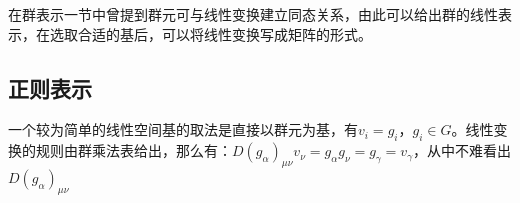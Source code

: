 \begin{issues}
\issueDraft
\end{issues}
在群表示一节中曾提到群元可与线性变换建立同态关系，由此可以给出群的线性表示，在选取合适的基后，可以将线性变换写成矩阵的形式。

\subsection{正则表示}

一个较为简单的线性空间基的取法是直接以群元为基，有$v_i=g_i$，$g_i \in G$。线性变换的规则由群乘法表给出，那么有：$D(g_\alpha)_{\mu\nu}v_\nu=g_\alpha g_\nu=g_\gamma=v_\gamma$，从中不难看出$D(g_\alpha)_{\mu\nu}$

